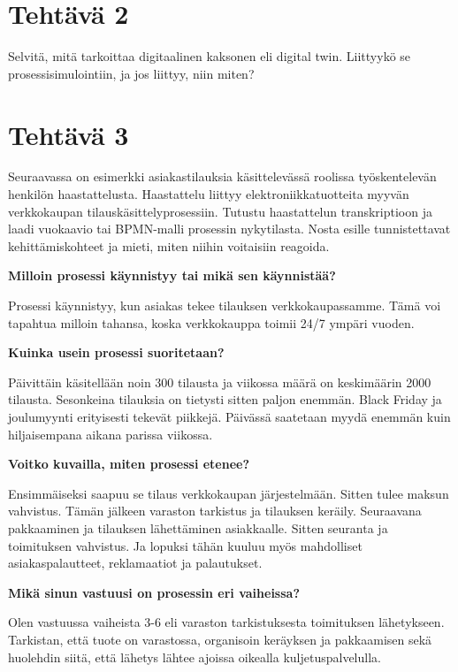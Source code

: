 \documentclass[
  finnish,
  letterpaper,
  DIV=11,
  numbers=noendperiod,
  oneside]{scrreprt}
\begin{document}
\section{Tehtävä 2}\label{tehtuxe4vuxe4-2}

Selvitä, mitä tarkoittaa digitaalinen kaksonen eli digital twin.
Liittyykö se prosessisimulointiin, ja jos liittyy, niin miten?

\section{Tehtävä 3}\label{tehtuxe4vuxe4-3}

Seuraavassa on esimerkki asiakastilauksia käsittelevässä roolissa
työskentelevän henkilön haastattelusta. Haastattelu liittyy
elektroniikkatuotteita myyvän verkkokaupan tilauskäsittelyprosessiin.
Tutustu haastattelun transkriptioon ja laadi vuokaavio tai BPMN-malli
prosessin nykytilasta. Nosta esille tunnistettavat kehittämiskohteet ja
mieti, miten niihin voitaisiin reagoida.

\textbf{Milloin prosessi käynnistyy tai mikä sen käynnistää?}

Prosessi käynnistyy, kun asiakas tekee tilauksen verkkokaupassamme. Tämä
voi tapahtua milloin tahansa, koska verkkokauppa toimii 24/7 ympäri
vuoden.

\textbf{Kuinka usein prosessi suoritetaan?}

Päivittäin käsitellään noin 300 tilausta ja viikossa määrä on
keskimäärin 2000 tilausta. Sesonkeina tilauksia on tietysti sitten
paljon enemmän. Black Friday ja joulumyynti erityisesti tekevät
piikkejä. Päivässä saatetaan myydä enemmän kuin hiljaisempana aikana
parissa viikossa.

\textbf{Voitko kuvailla, miten prosessi etenee?}

Ensimmäiseksi saapuu se tilaus verkkokaupan järjestelmään. Sitten tulee
maksun vahvistus. Tämän jälkeen varaston tarkistus ja tilauksen keräily.
Seuraavana pakkaaminen ja tilauksen lähettäminen asiakkaalle. Sitten
seuranta ja toimituksen vahvistus. Ja lopuksi tähän kuuluu myös
mahdolliset asiakaspalautteet, reklamaatiot ja palautukset.

\textbf{Mikä sinun vastuusi on prosessin eri vaiheissa?}

Olen vastuussa vaiheista 3-6 eli varaston tarkistuksesta toimituksen
lähetykseen. Tarkistan, että tuote on varastossa, organisoin keräyksen
ja pakkaamisen sekä huolehdin siitä, että lähetys lähtee ajoissa
oikealla kuljetuspalvelulla.
\end{document}
